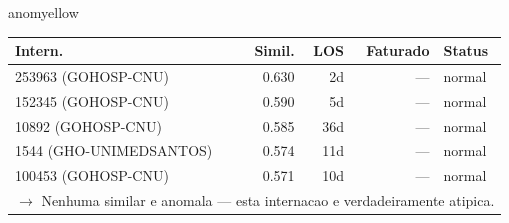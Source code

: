 \documentclass[a4paper,10pt]{article}
\begin{document}
\begin{anomalycard}[Internacao 160582 | PASA | MODERADO (z=2.18)]{anomyellow}
\begin{tabular}{l r r r l}\toprule\textbf{Intern.} & \textbf{Simil.} & \textbf{LOS} & \textbf{Faturado} & \textbf{Status} \\\midrule
253963 (GOHOSP-CNU) & 0.630 & 2d & --- & \textcolor{jcubeblue}{normal} \\
152345 (GOHOSP-CNU) & 0.590 & 5d & --- & \textcolor{jcubeblue}{normal} \\
10892 (GOHOSP-CNU) & 0.585 & 36d & --- & \textcolor{jcubeblue}{normal} \\
1544 (GHO-UNIMEDSANTOS) & 0.574 & 11d & --- & \textcolor{jcubeblue}{normal} \\
100453 (GOHOSP-CNU) & 0.571 & 10d & --- & \textcolor{jcubeblue}{normal} \\
\multicolumn{5}{l}{\textcolor{jcubeblue}{\small $\rightarrow$ Nenhuma similar e anomala --- esta internacao e verdadeiramente atipica.}} \\
\bottomrule\end{tabular}



\end{anomalycard}

\newpage
\end{document}
